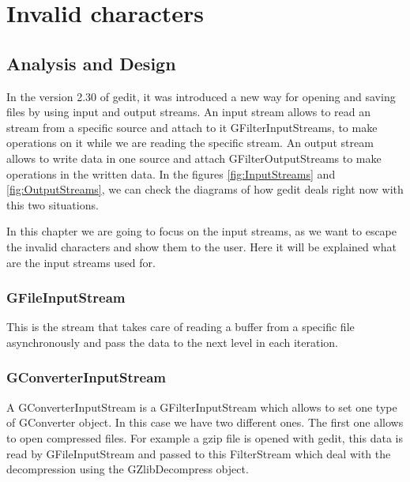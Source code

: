 
\chapter{Invalid characters}

\section{Analysis and Design}

In the version 2.30 of gedit, it was introduced a new way for opening and saving files by using input and output streams. An input stream allows to read an stream from a specific source and attach to it GFilterInputStreams, to make operations on it while we are reading the specific stream. An output stream allows to write data in one source and attach GFilterOutputStreams to make operations in the written data. In the figures \ref{fig:InputStreams} and \ref{fig:OutputStreams}, we can check the diagrams of how gedit deals right now with this two situations.



In this chapter we are going to focus on the input streams, as we want to escape the invalid characters and show them to the user. Here it will be explained what are the input streams used for.

\subsection*{GFileInputStream}

This is the stream that takes care of reading a buffer from a specific file asynchronously and pass the data to the next level in each iteration.

\subsection*{GConverterInputStream}

A GConverterInputStream is a GFilterInputStream which allows to set one type of GConverter object. In this case we have two different ones. The first one allows to open compressed files. For example a gzip file is opened with gedit, this data is read by GFileInputStream and passed to this FilterStream which deal with the decompression using the GZlibDecompress object.

